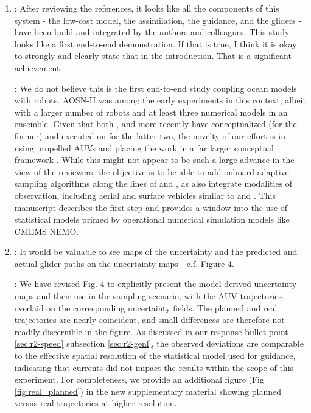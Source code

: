 \documentclass[a4paper]{article}
\begin{document}
\begin{answers}
\begin{enumerate}
  \item
    \reply: After reviewing the references, it looks like all the
    components of this system - the low-cost model, the assimilation,
    the guidance, and the gliders - have been build and integrated by
    the authors and colleagues. This study looks like a first end-to-end
    demonstration. If that is true, I think it is okay to strongly and
    clearly state that in the introduction. That is a significant
    achievement.

    \action: We do not believe this is the first end-to-end study
    coupling ocean models with robots. AOSN-II
    \cite{ramp2009preparing} was among the early experiments in this
    context, albeit with a larger number of robots and at least three
    numerical models in an ensemble. Given that both
    \cite{lermusiaux07}, \cite{ford22} and more recently
    \cite{wihsgott26} have conceptualized (for the former) and
    executed on for the latter two, the novelty of our effort is in
    using propelled AUVs and placing the work in a far larger
    conceptual framework \cite{rajan21}. While this might not appear
    to be such a large advance in the view of the reviewers, the
    objective is to be able to add onboard adaptive sampling
    algorithms along the lines of \cite{fossum18} and \cite{fossum19},
    as also integrate modalities of observation, including aerial and
    surface vehicles similar to \cite{sousa16} and
    \cite{pinto22}. This manuscript describes the first step and
    provides a window into the use of statistical models primed by
    operational numerical simulation models like CMEMS NEMO.

  \item

    \reply: It would be valuable to see maps of the uncertainty and
    the predicted and actual glider paths on the uncertainty maps -
    c.f.  Figure 4.

    \action: We have revised Fig. 4 to explicitly present the
    model-derived uncertainty maps and their use in the sampling
    scenario, with the AUV trajectories overlaid on the corresponding
    uncertainty fields. The planned and real trajectories are nearly
    coincident, and small differences are therefore not readily
    discernible in the figure. As discussed in our response bullet
    point \ref{sec:r2-speed} subsection \ref{sec:r2-genl}, the
    observed deviations are comparable to the effective spatial
    resolution of the statistical model used for guidance, indicating
    that currents did not impact the results within the scope of this
    experiment. For completeness, we provide an additional figure (Fig
    \ref{fig:real_planned}) in the new supplementary material showing
    planned versus real trajectories at higher resolution.


\end{enumerate}
\end{answers}
\end{document}
